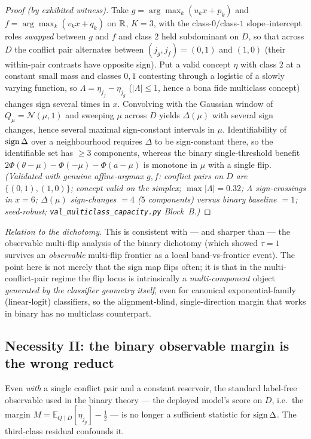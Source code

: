 \begin{proof}[Proof (by exhibited witness)]
Take $g=\arg\max_k(u_kx+p_k)$ and $f=\arg\max_k(v_kx+q_k)$ on $\mathbb R$, $K=3$, with the
class-$0$/class-$1$ slope--intercept roles \emph{swapped} between $g$ and $f$ and class $2$
held subdominant on $D$, so that across $D$ the conflict pair alternates between $(j_g,j_f)
=(0,1)$ and $(1,0)$ (their within-pair contrasts have opposite sign). Put a valid concept
$\eta$ with class $2$ at a constant small mass and classes $0,1$ contesting through a
logistic of a slowly varying function, so $\Lambda=\eta_{j_f}-\eta_{j_g}$ ($|\Lambda|\le1$,
hence a bona fide multiclass concept) changes sign several times in $x$. Convolving with
the Gaussian window of $Q_\mu=\mathcal N(\mu,1)$ and sweeping $\mu$ across $D$ yields
$\Delta(\mu)$ with several sign changes, hence several maximal sign-constant intervals in
$\mu$. Identifiability of $\operatorname{sign}\Delta$ over a neighbourhood requires $\Delta$ to be
sign-constant there, so the identifiable set has $\ge3$ components, whereas the binary
single-threshold benefit $2\Phi(\theta-\mu)-\Phi(-\mu)-\Phi(a-\mu)$ is monotone in $\mu$
with a single flip.
\emph{(Validated with genuine affine-argmax $g,f$: conflict pairs on $D$ are
$\{(0,1),(1,0)\}$; concept valid on the simplex; $\max|\Lambda|=0.32$; $\Lambda$
sign-crossings in $x=6$; $\Delta(\mu)$ sign-changes $=4$ ($5$ components) versus binary
baseline $=1$; seed-robust; \texttt{val\_multiclass\_capacity.py} Block~B.)}
\end{proof}

\noindent\emph{Relation to the dichotomy.} This is consistent with --- and sharper than ---
the observable multi-flip analysis of the binary dichotomy (which showed $\tau=1$ survives an
\emph{observable} multi-flip frontier as a local band-vs-frontier event). The point here is not merely that
the sign map flips often; it is that in the multi-conflict-pair regime the flip locus is
intrinsically a \emph{multi-component} object \emph{generated by the classifier geometry
itself}, even for canonical exponential-family (linear-logit) classifiers, so the
alignment-blind, single-direction margin that works in binary has no multiclass
counterpart.

\subsection{Necessity II: the binary observable margin is the wrong reduct}
\label{sec:mc-thirdclass}
Even \emph{with} a single conflict pair and a constant reservoir, the standard label-free
observable used in the binary theory --- the deployed model's score on $D$, i.e.\ the
margin $M=\mathbb E_{Q\mid D}[\eta_{j_g}]-\tfrac12$ --- is no longer a sufficient statistic
for $\operatorname{sign}\Delta$. The third-class residual confounds it.

